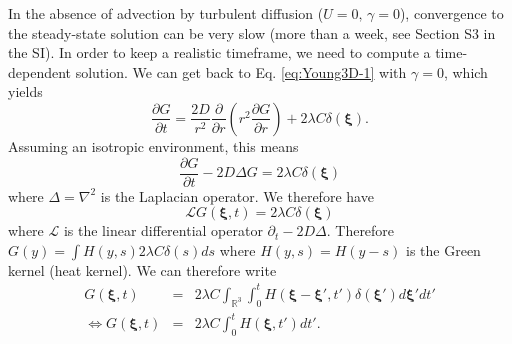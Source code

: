 \documentclass[12pt,english]{article}
\begin{document}
In the absence of advection by turbulent diffusion ($U=0,\,\gamma=0$),
convergence to the steady-state solution can be very slow (more than
a week, see Section S3 in the SI). In order to keep a realistic timeframe,
we need to compute a time-dependent solution. We can get back to Eq.
\ref{eq:Young3D-1} with $\gamma=0$, which yields 
\begin{equation}
\frac{\partial G}{\partial t}=\frac{2D}{r^{2}}\frac{\partial}{\partial r}\left(r^{2}\frac{\partial G}{\partial r}\right)+2\lambda C\delta(\boldsymbol{\xi}).\label{eq:G_no_adv}
\end{equation}
Assuming an isotropic environment, this means 
\begin{equation}
\frac{\partial G}{\partial t}-2D\Delta G=2\lambda C\delta(\boldsymbol{\xi})
\end{equation}
where $\Delta=\nabla^{2}$ is the Laplacian operator. We therefore
have 
\begin{equation}
\mathcal{L}G(\boldsymbol{\xi},t)=2\lambda C\delta(\boldsymbol{\xi})
\end{equation}
where $\mathcal{L}$ is the linear differential operator $\partial_{t}-2D\Delta$. Therefore $G(y)=\int H(y,s)2\lambda C\delta(s)ds$ where $H(y,s)=H(y-s)$ is the Green kernel (heat kernel). We can therefore write 
\begin{equation}
\begin{array}{ccc}
G(\boldsymbol{\xi},t) & = & 2\lambda C\int_{\mathbb{R}^{3}}\int_{0}^{t}H(\boldsymbol{\xi}-\boldsymbol{\xi}',t')\delta(\boldsymbol{\xi}')d\boldsymbol{\xi}'dt'\\
\Leftrightarrow G(\boldsymbol{\xi},t) & = & 2\lambda C\int_{0}^{t}H(\boldsymbol{\boldsymbol{\xi}},t')dt'.
\end{array}
\end{equation}
\end{document}
